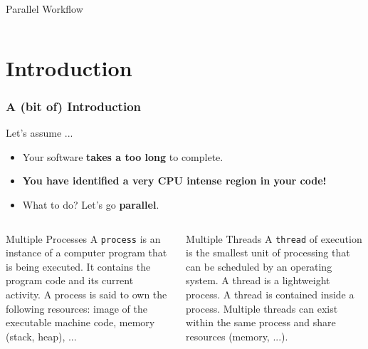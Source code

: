 \documentclass[9pt,pdftex]{beamer}
\begin{document}
\begin{frame}
\begin{columns}[t]
\begin{column}{.45\textwidth}
\begin{block}{Parallel  Workflow}
      \end{block}
    \end{column}
  \end{columns}
  \vfill
\end{frame}

\maketitle

\section[Intro]{Introduction}
\begin{frame}
\frametitle{A (bit of) Introduction}
\begin{block}{Let's assume ...}
  \begin{center}
    \begin{itemize}
    \item Your software \textbf{takes a too long} to complete.
    \item \textbf{You have identified a very CPU intense region in your code!} \\
    \item What to do? Let's go \textbf{parallel}.
    \end{itemize}
  \end{center}
\end{block}
\vfill
\begin{columns}[t]
  \begin{column}{.45\textwidth}
    \begin{block}{Multiple Processes}
      A \texttt{process}\cite{Wikipedia:Processes} is an instance of a computer program that is being executed. 
      It contains the program code and its current activity. A process is said to own the following resources: image of the executable machine code, memory (stack, heap), ...
    \end{block}
  \end{column}
\hfill
  \begin{column}{.45\textwidth}
    \begin{block}{Multiple Threads}
      A \texttt{thread}\cite{Wikipedia:Threads} of execution is the smallest unit of processing that can be scheduled by an operating system.
      A thread is a lightweight process. A thread is contained inside a process. 
      Multiple threads can exist within the same process and share resources (memory, ...).
    \end{block}
  \end{column}
\end{columns}
\vfill
\end{frame}
\end{document}
